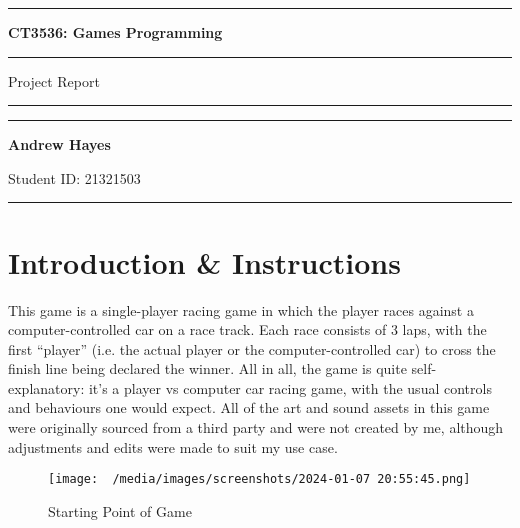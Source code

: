 \documentclass[a4paper,11pt]{article}
\author{Andrew Hayes}
\begin{document}
\begin{titlepage}
    \begin{center}
        \hrule
        \vspace*{0.6cm}
        \huge \textbf{CT3536: Games Programming}
        \vspace*{0.6cm}
        \hrule
        \LARGE
       \vspace{0.5cm}
       Project Report
       \vspace{0.5cm}
       \hrule
            
       \vfill
        \vfill

        \Large
       \vspace{0.5cm}
       \hrule
       \vspace{0.5cm}
       \textbf{Andrew Hayes}
            
       \normalsize
       Student ID: 21321503


       \vspace{0.5cm}
       \hrule
    \end{center}
\end{titlepage}

\newpage
\tableofcontents
\newpage
\setcounter{page}{1}

\section{Introduction \& Instructions}
This game is a single-player racing game in which the player races against a computer-controlled car on a race track.
Each race consists of 3 laps, with the first ``player'' (i.e. the actual player or the computer-controlled car) to cross the finish
line being declared the winner.
All in all, the game is quite self-explanatory: it's a player vs computer car racing game, with the usual controls and behaviours
one would expect.
All of the art and sound assets in this game were originally sourced from a third party and were not created by me, although 
adjustments and edits were made to suit my use case.

\begin{figure}[H]
    \centering
    \texttt{[image: ~/media/images/screenshots/2024-01-07 20:55:45.png]}
    \caption{Starting Point of Game}
\end{figure}
\end{document}
